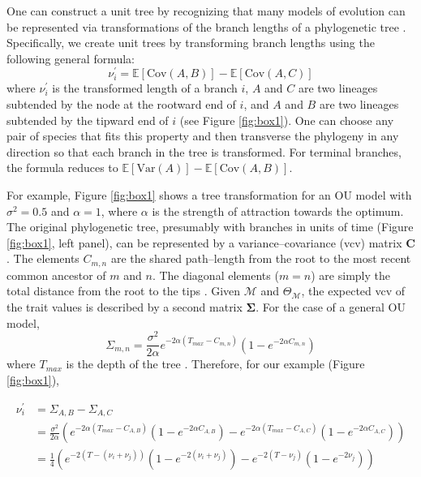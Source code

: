 \documentclass[a4paper,12pt]{article}
\begin{document}
One can construct a unit tree by recognizing that many models of evolution can be represented via transformations of the branch lengths of a phylogenetic tree \citep{Omeara2012, Ho2014}. Specifically, we create unit trees by transforming branch lengths using the following general formula:
\begin{equation}
\nu_i^\prime = \mathbb{E}[\mathrm{Cov}(A,B)] - \mathbb{E}[\mathrm{Cov}(A,C)]
\end{equation}
where $\nu_i^\prime$ is the transformed length of a branch $i$, $A$ and $C$ are two lineages subtended by the node at the rootward end of $i$, and $A$ and $B$ are two lineages subtended by the tipward end of $i$ (see Figure \ref{fig:box1}). One can choose any pair of species that fits this property and then transverse the phylogeny in any direction so that each branch in the tree is transformed. For terminal branches, the formula reduces to $\mathbb{E}[\mathrm{Var}(A)] - \mathbb{E}[\mathrm{Cov}(A,B)]$.

For example, Figure \ref{fig:box1} shows a tree transformation for an OU model with $\sigma^2=0.5$ and $\alpha = 1$, where $\alpha$ is the strength of attraction towards the optimum. The original phylogenetic tree, presumably with branches in units of time (Figure \ref{fig:box1}, left panel), can be represented by a variance--covariance (vcv) matrix $\mathbf{C}$. The elements $C_{m,n}$ are the shared path--length from the root to the most recent common ancestor of $m$ and $n$. The diagonal elements ($m = n$) are simply the total distance from the root to the tips \citep{Omeara2006}. Given $\mathcal{M}$ and $\Theta_{\mathcal{M}}$, the expected vcv of the trait values is described by a second matrix $\mathbf{\Sigma}$. For the case of a general OU model,
\begin{equation}
\Sigma_{m,n} = \frac{\sigma^2}{2\alpha} e^{-2\alpha (T_{max} - C_{m,n})} (1 - e^{-2\alpha C_{m,n}})
\end{equation} 
where $T_{max}$ is the depth of the tree \citep{Hansen1997, ButlerKing2004}. Therefore, for our example (Figure \ref{fig:box1}), 

\begin{align*}
  \nu_i^\prime &= \Sigma_{A,B} - \Sigma_{A,C}  \\ 
&= \frac{\sigma^2}{2\alpha} \left(e^{-2\alpha (T_{max} - C_{A,B})} (1 -e^{-2\alpha C_{A,B}})
- e^{-2 \alpha (T_{max} - C_{A,C})} (1 - e^{-2\alpha C_{A,C}}) \right)  \\
&= \frac{1}{4} \left( e^{-2 (T - (\nu_i + \nu_j))} (1 - e^{-2 (\nu_i + \nu_j)})
- e^{-2 (T - \nu_j)} (1 - e^{-2 \nu_j}) \right) 
\end{align*}
\end{document}
